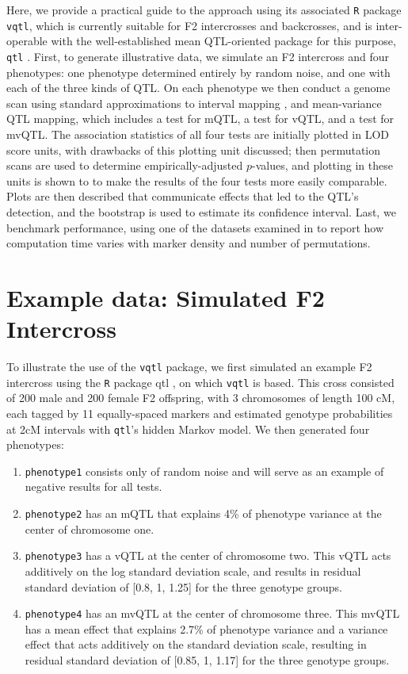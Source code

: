 \documentclass[9pt,twocolumn,twoside]{gsag3jnl}
\begin{document}
Here, we provide a practical guide to the approach using its associated \texttt{R} package \texttt{vqtl},
which is currently suitable for F2 intercrosses and backcrosses, and is inter-operable with the well-established mean QTL-oriented package for this purpose, \texttt{qtl} \citep{Broman2003}.
First, to generate illustrative data, we simulate an F2 intercross and four phenotypes: one phenotype determined entirely by random noise, and one with each of the three kinds of QTL.
On each phenotype we then conduct a genome scan using standard approximations to interval mapping \citep{Lander1989a,Martinez1992}, and mean-variance QTL mapping, which includes a test for mQTL, a test for vQTL, and a test for mvQTL.
The association statistics of all four tests are initially plotted in LOD score units, with drawbacks of this plotting unit discussed; then permutation scans are used to determine empirically-adjusted $p$-values, and plotting in these units is shown to to make the results of the four tests more easily comparable.
Plots are then described that communicate effects that led to the QTL's detection, and the bootstrap is used to estimate its confidence interval.
Last, we benchmark performance, using one of the datasets examined in \citet{Corty2018biorxiv} to report how computation time varies with marker density and number of permutations.


\section*{Example data: Simulated F2 Intercross}

To illustrate the use of the \texttt{vqtl} package, we first simulated an example F2 intercross using the \texttt{R} package {qtl} \citep{Broman2003}, on which \texttt{vqtl} is based.
This cross consisted of 200 male and 200 female F2 offspring, with 3 chromosomes of length 100 cM, each tagged by 11 equally-spaced markers and estimated genotype probabilities at 2cM intervals with \texttt{qtl}'s hidden Markov model. We then generated four phenotypes:
\begin{enumerate}
	\item \texttt{phenotype1} consists only of random noise and will serve as an example of negative results for all tests.
	\item \texttt{phenotype2} has an mQTL that explains 4\% of phenotype variance at the center of chromosome one.
	\item \texttt{phenotype3} has a vQTL at the center of chromosome two.
        This vQTL acts additively on the log standard deviation scale, and results in residual standard deviation of [0.8, 1, 1.25] for the three genotype groups.
	\item \texttt{phenotype4} has an mvQTL at the center of chromosome three.
        This mvQTL has a mean effect that explains 2.7\% of phenotype variance and a variance effect that acts additively on the standard deviation scale, resulting in residual standard deviation of [0.85, 1, 1.17] for the three genotype groups.
\end{enumerate}
\end{document}
